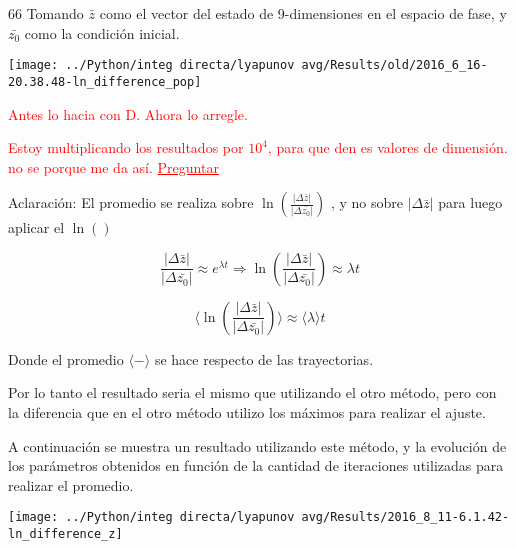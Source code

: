 66	Tomando $\bar{z}$ como el vector del estado de 9-dimensiones en el espacio de fase, y $\bar{z_0}$ como la condición inicial.

		\begin{center}
			\texttt{[image: ../Python/integ directa/lyapunov avg/Results/old/2016\_6\_16-20.38.48-ln\_difference\_pop]}
		\end{center}
		
		\textcolor{red}{Antes lo hacia con D. Ahora lo arregle.}
		
		\textcolor{red}{Estoy multiplicando los resultados por $10^4$, para que den es valores de dimensión. no se porque me da así. \underline{Preguntar}}
%	
%	
	

 	Aclaración: El promedio se realiza sobre $\ln (\tfrac{|\Delta\bar{z}|}{|\Delta \bar{z_0}|})$ , y no sobre $|\Delta \bar{z}|$ para luego aplicar el $\ln()$
	
	\[ \frac{|\Delta \bar{z}|}{|\Delta \bar{z_0}|} \approx e^{\lambda t} \Rightarrow \ln(\frac{|\Delta \bar{z}|}{|\Delta \bar{z_0}|})\approx \lambda t \]
	
	\[ \langle \ln(\frac{|\Delta \bar{z}|}{|\Delta \bar{z_0}|}) \rangle \approx \langle   \lambda  \rangle t  \]	
	
	Donde el promedio $\langle - \rangle$ se hace respecto de las trayectorias.
	
	Por lo tanto el resultado seria el mismo que utilizando el otro método, pero con la diferencia que en el otro método utilizo los máximos para realizar el ajuste. 
	
	A continuación se muestra un resultado utilizando este método, y la evolución de los parámetros obtenidos en función de la cantidad de iteraciones utilizadas para realizar el promedio.
	
	\begin{center}
		\texttt{[image: ../Python/integ directa/lyapunov avg/Results/2016\_8\_11-6.1.42-ln\_difference\_z]}
	\end{center}
		
